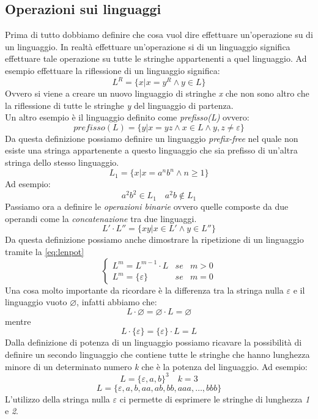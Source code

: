 \subsection{Operazioni sui linguaggi}
Prima di tutto dobbiamo definire che cosa vuol dire effettuare un'operazione su di un linguaggio. In realtà effettuare un'operazione si di un linguaggio significa effettuare tale operazione su tutte le stringhe appartenenti a quel linguaggio.
Ad esempio effettuare la riflessione di un linguaggio significa:
$$L^R = \{x|x= y^R\wedge y \in L\}$$
Ovvero si viene a creare un nuovo linguaggio di stringhe \emph{x} che non sono altro che la riflessione di tutte le stringhe \emph{y} del linguaggio di partenza.\\
Un altro esempio è il linguaggio definito come \emph{prefisso(L)} ovvero:
$$prefisso(L) = \{y|x = yz \wedge x\in L \wedge y,z \neq \varepsilon\}$$
Da questa definizione possiamo definire un linguaggio \emph{prefix-free} nel quale non esiste una stringa appartenente a questo linguaggio che sia prefisso di un'altra stringa dello stesso linguaggio.
$$L_1 = \{x | x = a^nb^n \wedge n\geq 1\}$$
Ad esempio:
$$a^2b^2 \in L_1 \quad a^2b \notin L_1$$
Passiamo ora a definire le \emph{operazioni binarie} ovvero quelle composte da due operandi come la \emph{concatenazione} tra due linguaggi.
$$L'\cdot L''= \{xy | x\in L' \wedge y \in L''\}$$
Da questa definizione possiamo anche dimostrare la ripetizione di un linguaggio tramite la \ref{eq:lenpot}
\begin{equation}\label{eq:lenpot}
\left\{
	\begin{array}{lcc}
	L^m = L^{m-1}\cdot L & se & m>0\\
	L^m = \{\varepsilon\} & se & m = 0
	\end{array}
	\right.
\end{equation}
Una cosa molto importante da ricordare è la differenza tra la stringa nulla $ \varepsilon $ e il linguaggio vuoto $ \varnothing $, infatti abbiamo che:
$$L\cdot \varnothing = \varnothing \cdot L = \varnothing$$
mentre
$$L \cdot \{\varepsilon\} = \{\varepsilon\}\cdot L = L $$
Dalla definizione di potenza di un linguaggio possiamo ricavare la possibilità di definire un secondo linguaggio che contiene tutte le stringhe che hanno lunghezza minore di un determinato numero \emph{k} che è la potenza del linguaggio. Ad esempio:
$$L = \{\varepsilon,a,b\}^3 \quad k = 3$$
$$L = \{\varepsilon,a,b,aa,ab,bb,aaa,\dots , bbb\}$$
L'utilizzo della stringa nulla $ \varepsilon $ ci permette di esprimere le stringhe di lunghezza \emph{1} e \emph{2}.\\

